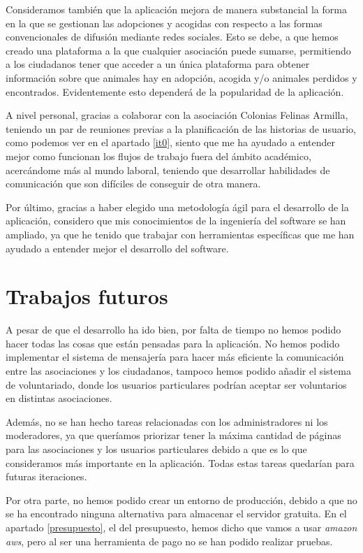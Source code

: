 Consideramos también que la aplicación mejora de manera substancial la forma en la que se gestionan las adopciones y acogidas con respecto a las formas convencionales de difusión mediante redes sociales. Esto se debe, a que hemos creado una plataforma a la que cualquier asociación puede sumarse, permitiendo a los ciudadanos tener que acceder a un única plataforma para obtener información sobre que animales hay en adopción, acogida y/o animales perdidos y encontrados. Evidentemente esto dependerá de la popularidad de la aplicación.

A nivel personal, gracias a colaborar con la asociación Colonias Felinas Armilla, teniendo un par de reuniones previas a la planificación de las historias de usuario, como podemos ver en el apartado \ref{it0}, siento que me ha ayudado a entender mejor como funcionan los flujos de trabajo fuera del ámbito académico, acercándome más al mundo laboral, teniendo que desarrollar habilidades de comunicación que son difíciles de conseguir de otra manera.

Por último, gracias a haber elegido una metodología ágil para el desarrollo de la aplicación, considero que mis conocimientos de la ingeniería del software se han ampliado, ya que he tenido que trabajar con herramientas específicas que me han ayudado a entender mejor el desarrollo del software.  


	
\section{Trabajos futuros}

A pesar de que el desarrollo ha ido bien, por falta de tiempo no hemos podido hacer todas las cosas que están pensadas para la aplicación. No hemos podido implementar el sistema de mensajería para hacer más eficiente la comunicación entre las asociaciones y los ciudadanos, tampoco hemos podido añadir el sistema de voluntariado, donde los usuarios particulares podrían aceptar ser voluntarios en distintas asociaciones.

Además, no se han hecho tareas relacionadas con los administradores ni los moderadores, ya que queríamos priorizar tener la máxima cantidad de páginas para las asociaciones y los usuarios particulares debido a que es lo que consideramos más importante en la aplicación. Todas estas tareas quedarían para futuras iteraciones.

Por otra parte, no hemos podido crear un entorno de producción, debido a que no se ha encontrado ninguna alternativa para almacenar el servidor gratuita. En el apartado \ref{presupuesto}, el del presupuesto, hemos dicho que vamos a usar \textit{amazon aws}, pero al ser una herramienta de pago no se han podido realizar pruebas.



